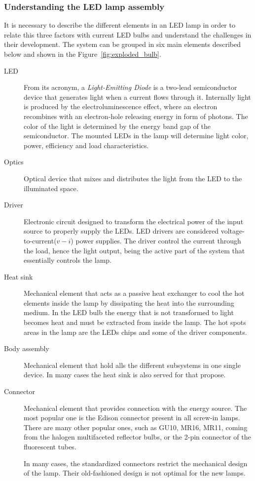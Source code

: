 \subsubsection{Understanding the LED lamp assembly}
It is necessary to describe the different elements in an LED lamp in order to relate this three factors with current LED bulbs and understand the challenges in their development. The system can be grouped in six main elements described below and shown in  the Figure~\ref{fig:exploded_bulb}.

\begin{description}
  \item[LED] From its acronym, a \emph{Light-Emitting Diode}  is a two-lead semiconductor device that generates light when a current flows through it. Internally light is produced by the electroluminescence effect, where an electron recombines with an electron-hole releasing energy in form of photons. The color of the light is determined by the energy band gap of the semiconductor. The mounted LEDs in the lamp will determine light color, power, efficiency and load characteristics.

  \item[Optics] Optical device that mixes and distributes the light from the LED to the illuminated space.

  \item[Driver] Electronic circuit designed to transform the electrical power of the input source to properly supply the LEDs. LED drivers are considered voltage-to-current($v-i$) power supplies.  The driver control the current through the load, hence the light output, being the active part of the system that essentially controls the lamp.

  \item[Heat sink] Mechanical element that acts as a passive heat exchanger to cool the hot elements inside the lamp by dissipating the heat into the surrounding medium. In the LED bulb the energy that is not transformed to light becomes heat and must be extracted from inside the lamp. The hot spots areas in the lamp are the LEDs chips and some of the driver components.

  \item[Body assembly] Mechanical element that hold alls the different subsystems in one single device. In many cases the heat sink is also served for that propose.

  \item[Connector] Mechanical element that provides connection with the energy source. The most popular one is the Edison connector present in all screw-in lamps. There are many other popular ones, such as GU10, MR16, MR11, coming from the halogen multifaceted reflector bulbs, or the 2-pin connector of the fluorescent tubes.

      In many cases, the standardized connectors restrict the mechanical design of the lamp. Their old-fashioned design is not optimal for the new lamps.
\end{description}


